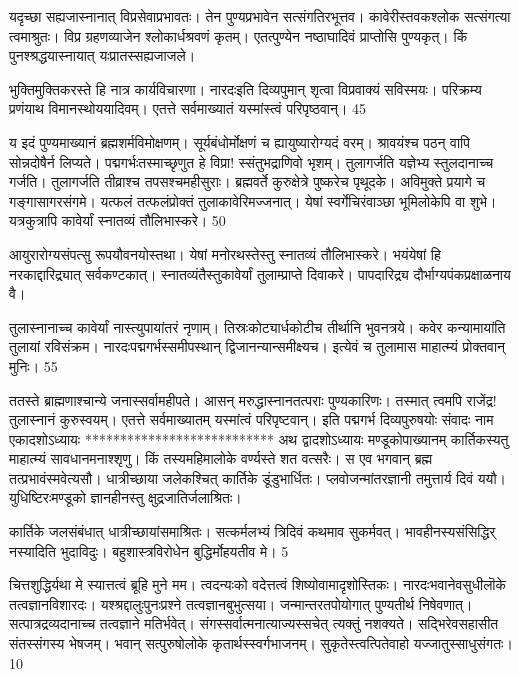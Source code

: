   यदृच्छा सह्यजास्नानात् विप्रसेवाप्रभावतः।
 तेन पुण्यप्रभावेन सत्संगतिरभूत्तव।
 कावेरीस्तवकश्लोक सत्संगत्या त्वमाश्रुतः।
 विप्र ग्रहणव्याजेन श्लोकार्धश्रवणं कृतम्।
 एतत्पुण्येन नष्ठाघादिवं प्राप्तोसि पुण्यकृत्।
 किं पुनश्श्रद्धयास्नायात् यःप्रातस्सह्यजाजले।
 
भुक्तिमुक्तिकरस्ते हि नात्र कार्यविचारणा।
 नारदःइति दिव्यपुमान् शृत्वा विप्रवाक्यं सविस्मयः।
 परिक्रम्य प्रणंयाथ विमानस्थोययादिवम्।
 एतत्ते सर्वमाख्यातं यस्मांस्त्वं परिपृष्ठवान्।
 45

  य इदं पुण्यमाख्यानं ब्रह्मशर्मविमोक्षणम्।
 सूर्यबंधोर्मोक्षणं च ह्यायुष्यारोग्यदं वरम्।
 श्रावयंश्च पठन् वापि सोन्नदोषैर्न लिप्यते।
 पद्मगर्भःतस्माच्छृणुत हे विप्रा! स्संतुभद्राणिवो भृशम्।
 तुलागर्जति यज्ञेभ्य स्तुलदानाच्च गर्जति।
 तुलागर्जति तीव्राश्च तपसश्चमहीसुराः।
 ब्रह्मवर्ते कुरुक्षेत्रे पुष्करेच पृथूदके।
 अविमुक्ते प्रयागे च गङ्गासागरसंगमे।
 यत्फलं तत्फलंप्रोक्तं तुलाकावेरिमज्जनात्।
 येषां स्वर्गेचिरंवाञ्छा भूमिलोकेपि वा शुभे।
 यत्रकुत्रापि कावेर्यां स्नातव्यं तौलिभास्करे।
 50

  आयुरारोग्यसंपत्सु रूपयौवनयोस्तथा।
 येषां मनोरथस्तेस्तु स्नातव्यं तौलिभास्करे।
 भयंयेषां हि नरकाद्दारिद्र्यात् सर्वकण्टकात्।
 स्नातव्यंतैस्तुकावेर्यां तुलाम्प्राप्ते दिवाकरे।
 पापदारिद्र्य दौर्भाग्यपंकप्रक्षाळनाय वै।
 
तुलास्नानाच्च कावेर्यां नास्त्युपायांतरं नृणाम्।
 तिस्रःकोट्यार्धकोटीच तीर्थानि भुवनत्रये।
 कवेर कन्यामायांति तुलायां रविसंक्रम।
 नारदःपद्मगर्भस्समीपस्थान् द्विजानन्यान्समीक्ष्यच।
 इत्येवं च तुलामास माहात्म्यं प्रोक्तवान् मुनिः।
 55

  ततस्ते ब्राह्मणाश्चान्ये जनास्सर्वामहीपते।
 आसन् मरुद्धास्नानतत्पराः पुण्यकारिणः।
 तस्मात् त्वमपि राजेंद्र! तुलास्नानं कुरुस्वयम्।
 एतत्ते सर्वमाख्यातम् यस्मांत्वं परिपृष्टवान्।
 इति पद्मगर्भ दिव्यपुरुषयोः संवादः नाम
एकादशोऽध्यायः
***************************
अथ द्वादशोऽध्यायः
मण्डूकोपाख्यानम् कार्तिकस्यतु माहात्म्यं सावधानमनाश्शृणु।
 किं तस्यमहिमालोके वर्ण्यस्ते शत वत्सरैः।
 स एव भगवान् ब्रह्म तत्प्रभावंस्मवेत्यसौ।
 धात्रीच्छाया जलेकश्चित् कार्तिके डूंडुभार्धितः।
 प्लवोजन्मांतरज्ञानी तमुत्तार्य दिवं ययौ।
 युधिष्टिरःमण्डूको ज्ञानहीनस्तु क्षुद्रजातिर्जलाश्रितः।
 
कार्तिके जलसंबंधात् धात्रीच्छायांसमाश्रितः।
 सत्कर्मलभ्यं त्रिदिवं कथमाव सुकर्मवत्।
 भावहीनस्यसंसिद्धिर् नस्यादिति भुदाविदुः।
 बहुशास्त्रविरोधेन बुद्धिर्मोहयतीव मे।
 5

  चित्तशुद्धिर्यथा मे स्यात्तत्वं ब्रूहि मुने मम।
 त्वदन्यःको वदेत्तत्वं शिष्योवामादृशोस्तिकः।
 नारदःभवानेवसुधीलॊके तत्वज्ञानविशारदः।
 यश्श्रद्दालुःपुनःप्रश्ने तत्वज्ञानबुभुत्सया।
 जन्मान्तरतपोयोगात् पुण्यतीर्थ निषेवणात्।
 सत्पात्रद्रव्यदानाच्च तत्वज्ञाने मतिर्भवेत्।
 संगस्सर्वात्मनात्याज्यस्सचेत् त्यक्तुं नशक्यते।
 सद्भिरेवसहासीत संतस्संगस्य भेषजम्।
 भवान् सत्पुरुषोलोके कृतार्थस्स्वर्गभाजनम्।
 सुकृतेस्त्वत्पितेवाहो यज्जातुस्साधुसंगतः।
 10

